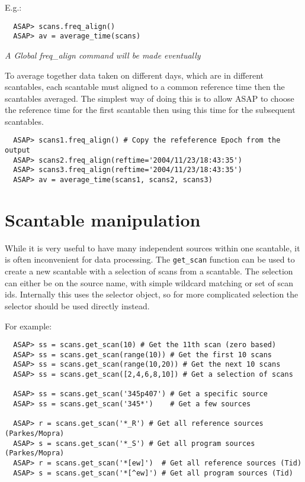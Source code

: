 \documentclass[11pt]{article}
\newcommand{\cmd}[1]{{\tt #1}}
\begin{document}
E.g.:

\begin{verbatim}
  ASAP> scans.freq_align()
  ASAP> av = average_time(scans)
\end{verbatim}

{\em A Global freq\_align command will be made eventually}

To average together data taken on different days, which are in
different scantables, each scantable must aligned to a common
reference time then the scantables averaged. The simplest way of
doing this is to allow ASAP to choose the reference time for the first
scantable then using this time for the subsequent scantables.

\begin{verbatim}
  ASAP> scans1.freq_align() # Copy the refeference Epoch from the output
  ASAP> scans2.freq_align(reftime='2004/11/23/18:43:35')
  ASAP> scans3.freq_align(reftime='2004/11/23/18:43:35')
  ASAP> av = average_time(scans1, scans2, scans3)
\end{verbatim}

\section{Scantable manipulation}

While it is very useful to have many
independent sources within one scantable, it is often inconvenient for
data processing. The \cmd{get\_scan} function can be used to create a
new scantable with a selection of scans from a scantable. The
selection can either be on the source name, with simple wildcard
matching or set of scan ids. Internally this uses the selector object,
so for more complicated selection the selector should be used directly
instead.

For example:

\begin{verbatim}
  ASAP> ss = scans.get_scan(10) # Get the 11th scan (zero based)
  ASAP> ss = scans.get_scan(range(10)) # Get the first 10 scans
  ASAP> ss = scans.get_scan(range(10,20)) # Get the next 10 scans
  ASAP> ss = scans.get_scan([2,4,6,8,10]) # Get a selection of scans

  ASAP> ss = scans.get_scan('345p407') # Get a specific source
  ASAP> ss = scans.get_scan('345*')    # Get a few sources

  ASAP> r = scans.get_scan('*_R') # Get all reference sources (Parkes/Mopra)
  ASAP> s = scans.get_scan('*_S') # Get all program sources (Parkes/Mopra)
  ASAP> r = scans.get_scan('*[ew]')  # Get all reference sources (Tid)
  ASAP> s = scans.get_scan('*[^ew]') # Get all program sources (Tid)

\end{verbatim}
\end{document}

